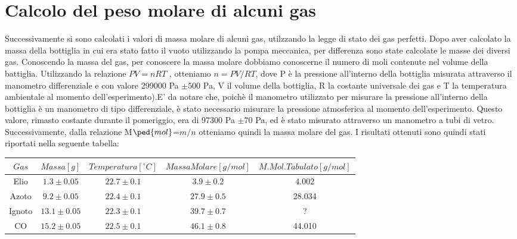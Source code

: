 \documentclass[a4paper,11pt]{article}
\begin{document}
\section{Calcolo del peso molare di alcuni gas}
Successivamente si sono calcolati i valori di massa molare di alcuni gas, utilzzando la legge di stato dei gas perfetti.
\newpage Dopo aver calcolato la massa della bottiglia in cui era stato fatto il vuoto utilizzando la pompa meccanica, per differenza sono state calcolate le masse dei diversi gas. Conoscendo la massa del gas, per conoscere la massa molare dobbiamo conoscerne il numero di moli contenute nel volume della battiglia. Utilizzando la relazione $PV=nRT$ , otteniamo $n=PV/RT$, dove P è la pressione all'interno della bottiglia misurata attraverso il manometro differenziale e con valore 299000 Pa $\pm500$ Pa, V il volume della bottiglia, R la costante universale dei gas e T la temperatura ambientale al momento dell'esperimento).E' da notare che, poichè il manometro utilizzato per misurare la pressione all'interno della bottiglia è un manometro di tipo differenziale, è stato necessario misurare la pressione atmosferica al momento dell'esperimento. Questo valore, rimasto costante durante il pomeriggio, era di 97300 Pa $\pm70$ Pa, ed è stato misurato attraverso un manometro a tubi di vetro. Successivamente, dalla relazione M$\ped{mol}$=$m/n$ otteniamo quindi la massa molare del gas. I risultati ottenuti sono quindi stati riportati nella seguente tabella: 
\hspace{-140pt}

\begin{center}
\begin{tabular}{|c|c|c|c|c|}
\hline \rule[-2ex]{0pt}{5.5ex} $Gas$ & $Massa [g]$ & $Temperatura [^\circ{C}]$ & $Massa Molare [g/mol]$ & $M. Mol. Tabulato [g/mol]$ \\ 
\hline \rule[-2ex]{0pt}{5.5ex} Elio & $1.3 \pm 0.05$ & $22.7 \pm 0.1$ & $3.9 \pm 0.2$ & 4.002 \\ 
\hline \rule[-2ex]{0pt}{5.5ex} Azoto & $9.2 \pm 0.05$ & $22.4 \pm 0.1$ & $27.9 \pm 0.5$ & 28.034 \\ 
\hline \rule[-2ex]{0pt}{5.5ex} Ignoto & $13.1 \pm 0.05$ & $22.3 \pm 0.1$ & $39.7 \pm 0.7$ & ? \\ 
\hline \rule[-2ex]{0pt}{5.5ex} CO\ped2 & $15.2 \pm 0.05$ & $22.5 \pm 0.1$ & $46.1 \pm 0.8$ & 44.010 \\ 
\hline 
\end{tabular}
\end{center}
\vspace{40pt}
\end{document}
